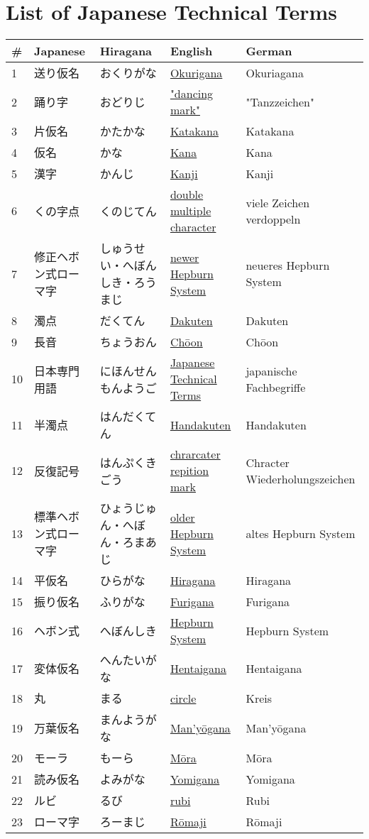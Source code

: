\chapter{List of Japanese Technical Terms}
\label{chap:JapaneseTechnicalTerms}
\footnotesize\Padding
\begin{longtable}[c]{p{.5cm}p{3.5cm}p{4cm}p{3.5cm}p{3.5cm}}
\textbf{\#}&\textbf{Japanese}&\textbf{Hiragana}&\textbf{English}&\textbf{German}\\ \hline
1&送り仮名&おくりがな&\hyperref[sec:Okurigana]{Okurigana}&Okuriagana\\
2&踊り字&おどりじ&\hyperref[sec:Dancingmark]{"dancing mark"}&"Tanzzeichen"\\
3&片仮名&かたかな&\hyperref[sec:Katakana]{Katakana}&Katakana\\
4&仮名&かな&\hyperref[sec:Kana]{Kana}&Kana\\
5&漢字&かんじ&\hyperref[sec:Kanji]{Kanji}&Kanji\\
6&くの字点&くのじてん&\hyperref[sec:Doublemultiplecharacter]{double multiple character}&viele Zeichen verdoppeln\\
7&修正ヘボン式ローマ字&しゅうせい・へぼんしき・ろうまじ&\hyperref[sec:NewerHepburnSystem]{newer Hepburn System}&neueres Hepburn System\\
8&濁点&だくてん&\hyperref[sec:Dakuten]{Dakuten}&Dakuten\\
9&長音&ちょうおん&\hyperref[sec:Choon]{Chōon}&Chōon\\
10&日本専門用語&にほんせんもんようご&\hyperref[sec:JapaneseTechnicalTerms]{Japanese Technical Terms}&japanische Fachbegriffe\\
11&半濁点&はんだくてん&\hyperref[sec:Handakuten]{Handakuten}&Handakuten\\
12&反復記号&はんぷくきごう&\hyperref[sec:Chrarcaterrepitionmark]{chrarcater repition mark}&Chracter Wiederholungszeichen\\
13&標準ヘボン式ローマ字&ひょうじゅん・へぼん・ろまあじ&\hyperref[sec:OlderHepburnSystem]{older Hepburn System}&altes Hepburn System\\
14&平仮名&ひらがな&\hyperref[sec:Hiragana]{Hiragana}&Hiragana\\
15&振り仮名&ふりがな&\hyperref[sec:Furigana]{Furigana}&Furigana\\
16&ヘボン式&へぼんしき&\hyperref[sec:HepburnSystem]{Hepburn System}&Hepburn System\\
17&変体仮名&へんたいがな&\hyperref[sec:Hentaigana]{Hentaigana}&Hentaigana\\
18&丸&まる&\hyperref[sec:Circle]{circle}&Kreis\\
19&万葉仮名&まんようがな&\hyperref[sec:Manyogana]{Man'yōgana}&Man'yōgana\\
20&モーラ&もーら&\hyperref[sec:Mora]{Mōra}&Mōra\\
21&読み仮名&よみがな&\hyperref[sec:Yomigana]{Yomigana}&Yomigana\\
22&ルビ&るび&\hyperref[sec:Rubi]{rubi}&Rubi\\
23&ローマ字&ろーまじ&\hyperref[sec:Romaji]{Rōmaji}&Rōmaji\\
\end{longtable}
